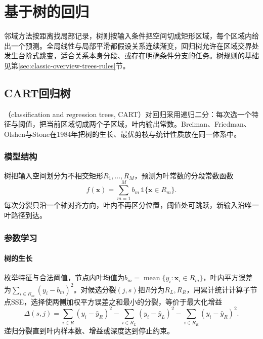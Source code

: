 \section{基于树的回归}
\label{sec:regression-trees}

邻域方法按距离找局部记录，树则按输入条件把空间切成矩形区域，每个区域内给出一个预测。全局线性与局部平滑都假设关系连续渐变，回归树允许在区域交界处发生台阶式跳变，适合关系本身分段、或存在明确条件分支的任务。树规则的基础见第\ref{sec:classic-overview-trees-rules}节。

\subsection{CART回归树}
\label{sec:regression-cart}

（classification and regression trees, CART）对回归采用递归二分：每次选一个特征与阈值，把当前区域切成两个子区域，叶内输出常数。Breiman、Friedman、Olshen与Stone在1984年把树的生长、最优剪枝与统计性质放在同一体系中。

\subsubsection{模型结构}
\label{sec:regression-cart-structure}

树把输入空间划分为不相交矩形$R_1,\ldots,R_M$，预测为叶常数的分段常数函数
\begin{equation}
  f(\bm{x})=\sum_{m=1}^M b_m\,\mathbb 1\{\bm{x}\in R_m\}.
  \label{eq:regression-cart-model}
\end{equation}
每次分裂只沿一个轴对齐方向，叶内不再区分位置，阈值处可跳跃，新输入沿唯一叶路径到达。

\subsubsection{参数学习}
\label{sec:regression-cart-learning}

\paragraph{树的生长}

枚举特征与合法阈值，节点内叶均值为$b_m=\operatorname{mean}\{y_i:\bm{x}_i\in R_m\}$，叶内平方误差为$\sum_{i\in R_m}(y_i-b_m)^2$。对候选分裂$(j,s)$把$R$分为$R_L,R_R$，用累计统计计算子节点SSE，选择使两侧加权平方误差之和最小的分裂，等价于最大化增益
\begin{equation}
  \Delta(s,j)
  =\sum_{i\in R}(y_i-\bar y_R)^2
   -\sum_{i\in R_L}(y_i-\bar y_L)^2
   -\sum_{i\in R_R}(y_i-\bar y_R)^2.
  \label{eq:regression-cart-gain}
\end{equation}
递归分裂直到叶内样本数、增益或深度达到停止约束。

